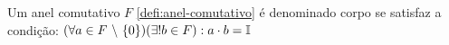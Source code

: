 \documentclass[../../main]{subfiles}
\begin{document}
    \begin{defi}[Corpo]\label{defi:corpo}
        Um anel comutativo $F$ \ref{defi:anel-comutativo} é denominado corpo se satisfaz a condição: $(\forall a \in F\ \backslash\ \{0\})(\exists! b \in F): a\cdot b=\mathbb{I}$
    \end{defi}
\end{document}
